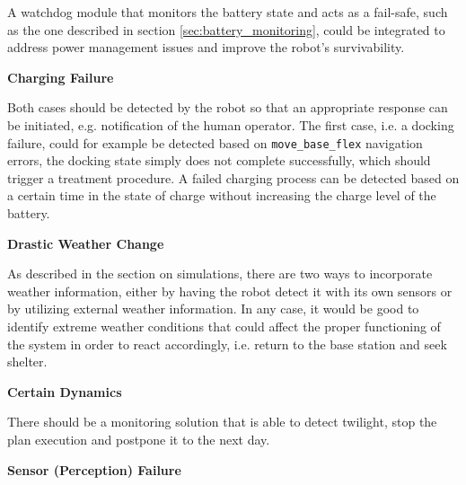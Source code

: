 \documentclass[english, master, utf8]{base/thesis_KBS}
\newcommand{\code}[1]{\colorbox{light-gray}{\texttt{#1}}}
\begin{document}
\noindent
A watchdog module that monitors the battery state and acts as a fail-safe, such as the one described in section \ref{sec:battery_monitoring}, could be 
integrated to address power management issues and improve the robot's survivability.\newline

\noindent
\textbf{Charging Failure}\newline

\noindent
Both cases should be detected by the robot so that an appropriate response can be initiated, e.g. notification of the human operator. The first case, i.e. a docking 
failure, could for example be detected based on \code{move\_base\_flex} navigation errors, the docking state simply does not complete successfully, which should trigger
a treatment procedure. A failed charging process can be detected based on a certain time in the state of charge without increasing the charge level of the battery.\newline

\noindent
\textbf{Drastic Weather Change}\newline

\noindent
As described in the section on simulations, there are two ways to incorporate weather information, either by having the robot detect it with its own sensors or by 
utilizing external weather information. In any case, it would be good to identify extreme weather conditions that could affect the proper functioning of the system 
in order to react accordingly, i.e. return to the base station and seek shelter.\newline

\noindent
\textbf{Certain Dynamics}\newline

\noindent
There should be a monitoring solution that is able to detect twilight, stop the plan execution and postpone it to the next day.\newline

\noindent
\textbf{Sensor (Perception) Failure}\newline
\end{document}
